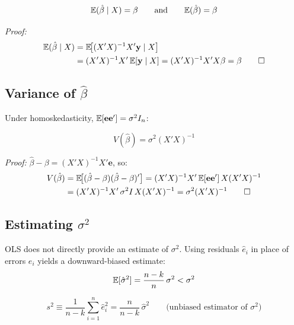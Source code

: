 \begin{equation}
  \mathbb{E}(\hat\beta \mid X) = \beta \qquad\text{and}\qquad \mathbb{E}(\hat\beta) = \beta
\end{equation}

\noindent\textit{Proof:}
\begin{align*}
  \mathbb{E}(\hat\beta \mid X)
  &= \mathbb{E}\!\bigl[(X'X)^{-1}X'\mathbf{y} \mid X\bigr] \\
  &= (X'X)^{-1}X'\,\mathbb{E}[\mathbf{y} \mid X]
   = (X'X)^{-1}X'X\beta = \beta \qquad\square
\end{align*}

\subsection{Variance of $\hat\beta$}

Under homoskedasticity, $\mathbb{E}[\mathbf{e}\mathbf{e}'] = \sigma^2 I_n$:

\begin{tcolorbox}[keyresult]
\begin{equation}
  V(\hat\beta) = \sigma^2(X'X)^{-1}
  \label{eq_VarBeta}
\end{equation}
\end{tcolorbox}

\noindent\textit{Proof:} $\hat\beta - \beta = (X'X)^{-1}X'\mathbf{e}$, so:
\begin{align*}
  V(\hat\beta)
  &= \mathbb{E}\!\bigl[(\hat\beta-\beta)(\hat\beta-\beta)'\bigr]
   = (X'X)^{-1}X'\,\mathbb{E}[\mathbf{e}\mathbf{e}']\,X(X'X)^{-1} \\
  &= (X'X)^{-1}X'\,\sigma^2 I\,X(X'X)^{-1}
   = \sigma^2(X'X)^{-1} \qquad\square
\end{align*}

\subsection{Estimating $\sigma^2$}

OLS does not directly provide an estimate of $\sigma^2$. Using residuals
$\hat{e}_i$ in place of errors $e_i$ yields a downward-biased estimate:
\begin{equation}
  \mathbb{E}[\hat\sigma^2] = \frac{n-k}{n}\,\sigma^2 < \sigma^2
\end{equation}

\begin{tcolorbox}[keyresult]
\begin{equation}
  s^2 \equiv \frac{1}{n-k}\sum_{i=1}^{n}\hat{e}_i^2
  = \frac{n}{n-k}\,\hat\sigma^2
  \qquad \text{(unbiased estimator of }\sigma^2\text{)}
\end{equation}
\end{tcolorbox}

